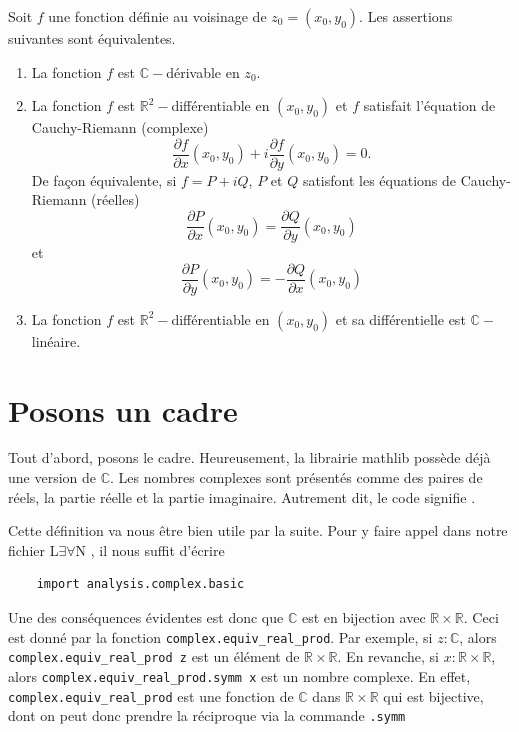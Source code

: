 \documentclass[a4paper, 11pt, twoside]{report}
\newcommand\R{\mathbb{R}}
\newcommand\C{\mathbb{C}}
\newcommand{\LEAN}{L$\exists\forall$N }
\begin{document}
\begin{tcolorbox}[colback = red!10, colframe = red!80, title = Équations de Cauchy-Riemann, fonttitle = \large\bfseries]

Soit $f$ une fonction définie au voisinage de $z_0=(x_0,y_0)$. Les assertions suivantes sont équivalentes.
		\begin{enumerate}
			\item La fonction $f$ est $\C-$dérivable en $z_0$.
			\item La fonction $f$ est $\R^2-$différentiable en $(x_0,y_0)$ et $f$ satisfait l'équation de Cauchy-Riemann (complexe)
			\[\frac{\partial f}{\partial x}(x_0,y_0) + i\frac{\partial f}{\partial y}(x_0,y_0) = 0.\]
			De façon équivalente, si $f=P+iQ$, $P$ et $Q$ satisfont les équations de Cauchy-Riemann (réelles)
			\[\frac{\partial P}{\partial x}(x_0,y_0) = \frac{\partial Q}{\partial y}(x_0,y_0)\]
			et \[\frac{\partial P}{\partial y}(x_0,y_0) = -\frac{\partial Q}{\partial x}(x_0,y_0)\]
			\item La fonction $f$ est $\R^2-$différentiable en $(x_0,y_0)$ et sa différentielle est $\C-$linéaire.
		\end{enumerate}
\end{tcolorbox}

\section{Posons un cadre}

Tout d'abord, posons le cadre. Heureusement, la librairie mathlib possède déjà une version de $\C$. Les nombres complexes sont présentés comme des paires de réels, la partie réelle et la partie imaginaire. Autrement dit, le code \fbox{$z : \C$} signifie \fbox{$x\, y : \R, z = (x,y)$}. 

Cette définition va nous être bien utile par la suite. Pour y faire appel dans notre fichier \LEAN, il nous suffit d'écrire 

\begin{lstlisting}
	import analysis.complex.basic 
\end{lstlisting}


Une des conséquences évidentes est donc que $\C$ est en bijection avec $\R\times \R$. Ceci est donné par la fonction \verb|complex.equiv_real_prod|. Par exemple, si $z:\C$, alors \verb|complex.equiv_real_prod z| est un élément de $\R\times \R$. En revanche, si $x : \R\times\R$, alors \verb|complex.equiv_real_prod.symm x| est un nombre complexe. En effet, \verb|complex.equiv_real_prod| est une fonction de $\C$ dans $\R\times\R$ qui est bijective, dont on peut donc prendre la réciproque via la commande \verb|.symm|
\end{document}
